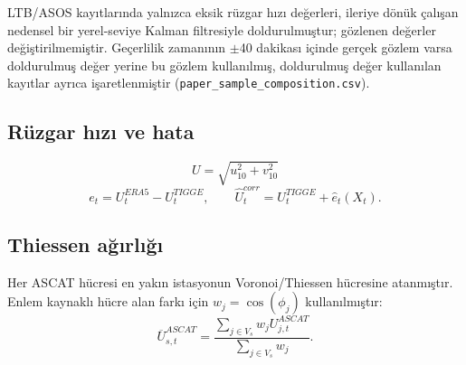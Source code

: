 \documentclass[11pt,a4paper]{article}
\begin{document}
LTB/ASOS kayıtlarında yalnızca eksik rüzgar hızı değerleri, ileriye dönük çalışan nedensel bir yerel-seviye Kalman filtresiyle doldurulmuştur; gözlenen değerler değiştirilmemiştir. Geçerlilik zamanının $\pm$40 dakikası içinde gerçek gözlem varsa doldurulmuş değer yerine bu gözlem kullanılmış, doldurulmuş değer kullanılan kayıtlar ayrıca işaretlenmiştir (\texttt{paper\_sample\_composition.csv}).

\subsection{Rüzgar hızı ve hata}
\begin{equation}
U = \sqrt{u_{10}^2+v_{10}^2}
\end{equation}
\begin{equation}
e_t = U_t^{ERA5}-U_t^{TIGGE}, \qquad
\widehat{U}_t^{corr}=U_t^{TIGGE}+\widehat{e}_t(X_t).
\end{equation}

\subsection{Thiessen ağırlığı}
Her ASCAT hücresi en yakın istasyonun Voronoi/Thiessen hücresine atanmıştır. Enlem kaynaklı hücre alan farkı için $w_j=\cos(\phi_j)$ kullanılmıştır:
\begin{equation}
\overline{U}_{s,t}^{ASCAT} =
\frac{\sum_{j\in V_s}w_j U_{j,t}^{ASCAT}}
{\sum_{j\in V_s}w_j}.
\end{equation}
\end{document}
